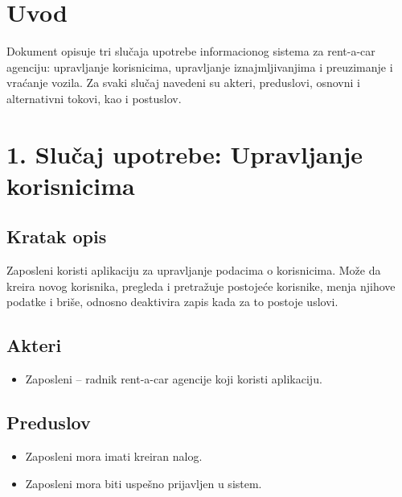 \documentclass[12pt,a4paper]{article}
\begin{document}

\section*{Uvod}

Dokument opisuje tri slučaja upotrebe informacionog sistema za
rent-a-car agenciju: upravljanje korisnicima, upravljanje iznajmljivanjima
i preuzimanje i vraćanje vozila. Za svaki slučaj navedeni su akteri,
preduslovi, osnovni i alternativni tokovi, kao i postuslov.



\section*{1. Slučaj upotrebe: Upravljanje korisnicima}

\subsection*{Kratak opis}

Zaposleni koristi aplikaciju za upravljanje podacima o korisnicima. Može da
kreira novog korisnika, pregleda i pretražuje postojeće korisnike, menja njihove
podatke i briše, odnosno deaktivira zapis kada za to postoje uslovi.

\subsection*{Akteri}

\begin{itemize}
    \item Zaposleni -- radnik rent-a-car agencije koji koristi aplikaciju.
\end{itemize}

\subsection*{Preduslov}

\begin{itemize}
    \item Zaposleni mora imati kreiran nalog.
    \item Zaposleni mora biti uspešno prijavljen u sistem.
\end{itemize}
\end{document}
